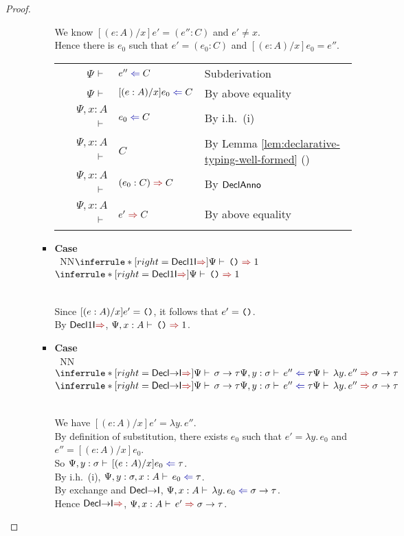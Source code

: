\documentclass[a4paper]{article}
\makeatletter
\newcommand{\mathcolor}[2]{\text{\textcolor{#1}{\ensuremath{#2}}}}
\newcommand{\arr}{\rightarrow}
\def\CompactJudgments{0}
\newcommand{\entails}{\mathrel{\ifnum\CompactJudgments=1\vdash \else \vdash\,\fi}}
\newcommand{\tyname}[1]{\textsf{\normalfont #1}}
\newcommand{\unitexp}{\text{\normalfont \tt()}}
\newcommand{\unitty}{\tyname{1}}
\newcommand{\Lemmaref}[1]{Lemma \ref{#1} (\nameref{#1})}   \newcommand{\Lemref}[1]{\Lemma \ref{#1}}   \newcommand{\Conjectureref}[1]{Conjecture \ref{#1}}
\gdef\xxDerivationProofCaseColor{N}
\newcommand{\DerivationProofCase}[3]{\smallskip
     \item \parbox[t]{100ex}{\textbf{Case } \\[-0.5em]
       $~$\hspace{5ex}
       \if\xxDerivationProofCaseColor N\ensuremath{\Infer{#1}{#2}{#3}}
       \else \colorbox{\xxDerivationProofCaseColor}{\ensuremath{\Infer{#1}{#2}{#3}}}\fi }\nopagebreak \\[-0.8ex]
  }
\newcommand{\BeginProof}{\renewcommand{\arraystretch}{1.1} \begin{tabular}[b]{r@{}r @{} l  l}}
\newcommand{\EndProof}{\end{tabular} \renewcommand{\arraystretch}{\mydefaultarraystretch}}
\newcommand{\Hand}{\text{\Pointinghand~~~~}}
\newcommand{\Pf}[4] {&$#1$ $#2$\, & $#3$ & #4 \\}
\newenvironment{llproof}{\BeginProof}{\EndProof}
\newcommand{\Infer}[3]{\inferrule*[right={\text{\strut#1}}]{{}#2\mathstrut}{{}#3\mathstrut}}
\newcommand{\lam}[1]{\lambda #1.\,}
\newcommand{\chkcolor}{dBlue}
\newcommand{\syncolor}{dRed}
\newcommand{\chk}{\mathrel{\mathcolor{\chkcolor}{\Leftarrow}}}
\newcommand{\uncoloredsyn}{{\Rightarrow}}
\newcommand{\syn}{\mathrel{\mathcolor{\syncolor}{\uncoloredsyn}}}
\newcommand{\declchkjudg}[3]{\ensuremath{{#1} \entails {#2} \chk {#3}}}
\newcommand{\declsynjudg}[3]{\ensuremath{{#1} \entails {#2} \syn {#3}}}
\newcommand{\declchkjudgPf}[4]{\Pf{#1}{\entails}{{#2} \chk {#3}}{#4}}
\newcommand{\declsynjudgPf}[4]{\Pf{#1}{\entails}{{#2} \syn {#3}}{#4}}
\newcommand{\judgetp}[2]{{#1} \entails {#2}}
\newcommand{\judgetpPf}[3]{\Pf{#1}{\entails}{#2}{#3}}
\newcommand{\rulename}[1]{\text{\normalfont\textsf{#1}}}
\newcommand{\Decltyrulename}[1]{\ensuremath{\rulename{Decl#1}}\xspace}
\newcommand{\DeclIntrorulename}[1]{\Decltyrulename{\ensuremath{#1}I}}
\newcommand{\DeclIntroSynrulename}[1]{\Decltyrulename{\ensuremath{#1}I$\syn$}}
\newcommand{\DeclAnno}{\Decltyrulename{Anno}}
\newcommand{\DeclUnitIntroSyn}{\DeclIntroSynrulename{\unitty}}
\newcommand{\DeclArrIntro}{\DeclIntrorulename{\arr}}
\newcommand{\DeclArrIntroSyn}{\DeclIntroSynrulename{\arr}}
\makeatother
\begin{document}
\begin{proof}
\begin{enumerate}[(i)]
\begin{itemize}
\begin{itemize}
                       We know $[(e:A)/x]e' = (e'' : C)$ and $e' \neq x$. \\
                       Hence there is $e_0$ such that $e' = (e_0 : C)$ and $[(e:A)/x]e_0 = e''$.

                       \smallskip

                       \begin{llproof}
                         \declchkjudgPf{\Psi}{e''}{C}  {Subderivation}
                         \declchkjudgPf{\Psi}{[(e:A)/x]e_0}{C}  {By above equality}
                         \declchkjudgPf{\Psi, x:A}{e_0}{C} {By i.h.\ (i)}
                         \judgetpPf{\Psi, x:A}{C} {By \Lemmaref{lem:declarative-typing-well-formed}}
                         \declsynjudgPf{\Psi, x:A}{(e_0 : C)}{C} {By \DeclAnno}
                       \Hand  \declsynjudgPf{\Psi, x:A}{e'}{C} {By above equality}
                       \end{llproof}

                       \smallskip

                   \DerivationProofCase{\DeclUnitIntroSyn}
                              { }
                              {\declsynjudg{\Psi}{\unitexp}{\unitty}}

                       Since $[(e:A)/x]e' = \unitexp$, it follows that $e' = \unitexp$. \\ 
                       By \DeclUnitIntroSyn, $\declsynjudg{\Psi, x:A}{\unitexp}{\unitty}$. 

                   \DerivationProofCase{\DeclArrIntroSyn}
                              {\judgetp{\Psi}{\sigma \arr \tau}
                                \\
                                \declchkjudg{\Psi, y : \sigma}{e''}{\tau}
                              }
                              {\declsynjudg{\Psi}{\lam{y} e''}{\sigma \arr \tau}}

                       We have $[(e:A)/x]e' = \lam{y}{e''}$. \\
                       By definition of substitution,
                           there exists $e_0$ such that $e' = \lam{y}{e_0}$ and $e'' = [(e:A)/x]e_0$. \\ 
                       So $\declchkjudg{\Psi, y : \sigma}{[(e:A)/x]e_0}{\tau}$. \\ 
                       By i.h.\ (i), $\declchkjudg{\Psi, y : \sigma, x:A}{e_0}{\tau}$. \\
                       By exchange and \DeclArrIntro, $\declchkjudg{\Psi, x:A}{\lam{y}e_0}{\sigma \arr \tau}$. \\
                       Hence \DeclArrIntroSyn, $\declsynjudg{\Psi, x:A}{e'}{\sigma \arr \tau}$. 


\end{itemize}
\end{itemize}
\end{enumerate}
\end{proof}
\end{document}
